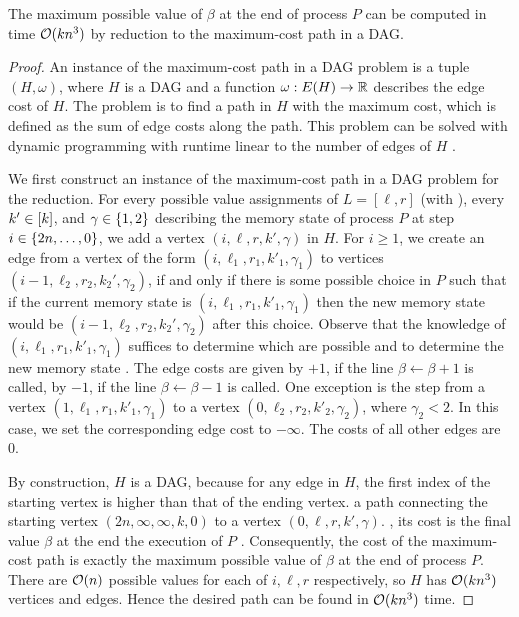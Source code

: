 \begin{lemma}
\label{lem:ham_path}
The maximum possible value of $\beta$ at the end of process $P$ can be computed in time $\mathcal{O}(kn^3)$ by reduction to the maximum-cost path in a DAG.
\end{lemma}
\begin{proof}
An instance of the maximum-cost path in a DAG problem is a tuple $(H, \omega)$, where $H$ is a DAG and a function $\omega: E(H) \to \mathbb{R}$ describes the edge cost of $H$.
The problem is to find a path in $H$ with the maximum cost, which is defined as the sum of edge costs along the path.
This problem can be solved with dynamic programming with runtime linear to the number of edges  of $H$ .

We first construct an instance of the maximum-cost path in a DAG problem for the reduction. 
For every possible value assignments of $L = [\ell, r]$ (with ), every $k' \in [k]$, and $\gamma \in \{ 1,2 \}$ describing the memory state of process $P$ at step $i \in \{ 2n, \ldots, 0 \}$, we add a vertex $(i,\ell,r,k',\gamma)$ in $H$. 
For $i \geq 1$, we create an edge from a vertex of the form $(i,\ell_1,r_1,k'_1,\gamma_1)$ to vertices $(i-1,\ell_2,r_2,k_2',\gamma_2)$, if and only if there is some possible choice in $P$ such that if the current memory state is $(i,\ell_1,r_1,k'_1,\gamma_1)$ then the new memory state would be $(i-1, \ell_2, r_2, k_2',\gamma_2)$ after this choice. 
Observe that the knowledge of $(i, \ell_1, r_1, k'_1,\gamma_1)$ suffices to determine which  are possible and to determine the new memory state . 
The edge costs are given by $+1$, if the line $\beta \leftarrow \beta + 1$ is called, by $-1$, if the line $\beta \leftarrow \beta- 1$ is called.
One exception is the step from a vertex $(1,\ell_1,r_1,k'_1,\gamma_1)$ to a vertex $(0,\ell_2,r_2,k'_2,\gamma_2)$, where $\gamma_2 < 2$.
In this case, we set the corresponding edge cost to $-\infty$.
The costs of all other edges are 0.

By construction, $H$ is a DAG, because for any edge in $H$, the first index of the starting vertex is higher than that of the ending vertex.
 a path connecting the starting vertex $(2n, \infty, \infty, k, 0)$ to a vertex $(0, \ell, r, k', \gamma)$. , its cost is the final value  $\beta$ at the end  the execution of $P$ .
Consequently, the cost of the maximum-cost path is exactly the maximum possible value of $\beta$ at the end of process $P$. 
There are $\mathcal{O}(n)$ possible values for each of $i, \ell, r$ respectively, so $H$ has $\mathcal{O}(kn^3)$ vertices and edges. Hence the desired path can be found in $\mathcal{O}(kn^3)$ time.
 
\end{proof}

